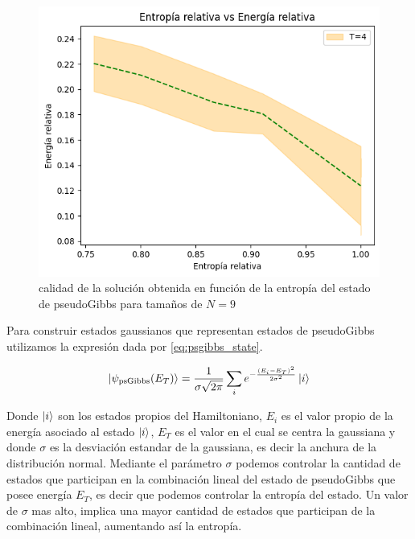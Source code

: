 \begin{figure}[!h]
    \centering
    \includegraphics[scale = 0.75]{plt/06-entropia_vs_energia_pesudo_gibbs.png}
    \caption{calidad de la solución obtenida en función de la entropía del estado de pseudoGibbs para tamaños de $N=9$}
    \label{fig:entropia_vs_energia_pseudogibbs}
\end{figure}

Para construir estados gaussianos que representan estados de pseudoGibbs utilizamos la expresión dada por \ref{eq:psgibbs_state}.

\begin{equation}
    \ket{\psi_{\text{psGibbs}}(E_{T})} = \frac{1}{\sigma \sqrt{2 \pi}} \sum_{i}e^{-\frac{(E_{i} - E_{T})^2}{2 \sigma^2}} \ket{i}
    \label{eq:psgibbs_state}
\end{equation}

Donde $\ket{i}$ son los estados propios del Hamiltoniano, $E_{i}$ es el valor propio de la energía asociado al estado $\ket{i}$, $E_T$ es el valor en el cual se centra la gaussiana y donde $\sigma$ es la desviación estandar de la gaussiana, es decir la anchura de la distribución normal. Mediante el parámetro $\sigma$ podemos controlar la cantidad de estados que participan en la combinación lineal del estado de pseudoGibbs que posee energía $E_T$, es decir que podemos controlar la entropía del estado. Un valor de $\sigma$ mas alto, implica una mayor cantidad de estados que participan de la combinación lineal, aumentando así la entropía. \\

